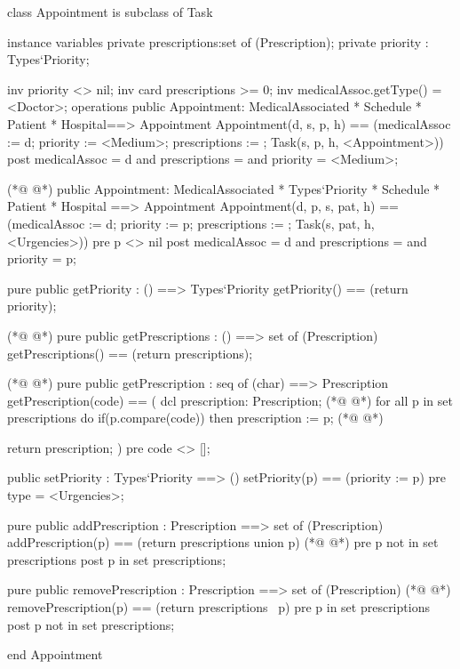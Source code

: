 \begin{vdmpp}[breaklines=true]
class Appointment is subclass of Task

instance variables
  private prescriptions:set of (Prescription);
  private priority : Types`Priority;
  
  inv priority <> nil;
  inv card prescriptions >= 0;
  inv medicalAssoc.getType() = <Doctor>;
operations
 public Appointment: MedicalAssociated * Schedule * Patient * Hospital==> Appointment
  Appointment(d, s, p, h) == (medicalAssoc := d; priority := <Medium>; prescriptions := {}; Task(s, p, h, <Appointment>))
 post medicalAssoc = d and prescriptions = {} and priority = <Medium>;
 
(*@
\label{Appointment:15}
@*)
 public Appointment: MedicalAssociated * Types`Priority * Schedule * Patient * Hospital ==> Appointment
  Appointment(d, p, s, pat, h) == (medicalAssoc := d; priority := p; prescriptions := {}; Task(s, pat, h, <Urgencies>))
 pre p <> nil
 post medicalAssoc = d and prescriptions = {} and priority = p;

 pure public getPriority : () ==> Types`Priority
  getPriority() == (return priority);
 
(*@
\label{getTypeAppointment:23}
@*)
  pure public getPrescriptions : () ==> set of (Prescription)
   getPrescriptions() == (return prescriptions);
   
(*@
\label{getPriority:26}
@*)
  pure public getPrescription : seq of (char) ==> Prescription
   getPrescription(code) == (
                dcl prescription: Prescription;
(*@
\label{getPrescriptions:29}
@*)
                 for all p in set prescriptions do
                  if(p.compare(code))
                   then prescription := p;
(*@
\label{getPrescription:32}
@*)
                 
                 return prescription;
                )
  pre code <> [];
  
  public setPriority : Types`Priority ==> ()
   setPriority(p) == (priority := p)
  pre type = <Urgencies>;
  
  pure public addPrescription : Prescription ==> set of (Prescription)
   addPrescription(p) == (return prescriptions union {p})
(*@
\label{setPriority:43}
@*)
  pre p not in set prescriptions
  post p in set prescriptions;
                 
 pure public removePrescription : Prescription ==> set of (Prescription)
(*@
\label{addPrescription:47}
@*)
   removePrescription(p) == (return prescriptions \ {p})
  pre p in set prescriptions
  post p not in set prescriptions;
   
end Appointment
\end{vdmpp}

